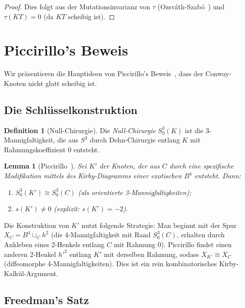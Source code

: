\documentclass[12pt,a4paper]{amsart}
\newtheorem{lemma}[theorem]{Lemma}
\theoremstyle{definition}
\newtheorem{definition_de}[theorem]{Definition}
\theoremstyle{remark}
\begin{document}
\begin{proof}
Dies folgt aus der Mutationsinvarianz von $\tau$ (Ozsváth-Szabó~\cite{OzsvathSzabo2004})
und $\tau(KT) = 0$ (da $KT$ scheibig ist).
\end{proof}

\section{Piccirillo's Beweis}

Wir präsentieren die Hauptideen von Piccirillo's Beweis~\cite{Piccirillo2020},
dass der Conway-Knoten nicht glatt scheibig ist.

\subsection{Die Schlüsselkonstruktion}

\begin{definition_de}[Null-Chirurgie]
Die \emph{Null-Chirurgie} $S^3_0(K)$ ist die 3-Mannigfaltigkeit, die aus
$S^3$ durch Dehn-Chirurgie entlang $K$ mit Rahmungskoeffizient 0 entsteht.
\end{definition_de}

\begin{lemma}[Piccirillo~\cite{Piccirillo2020}]
\label{lem:Piccirillo}
Sei $K'$ der Knoten, der aus $C$ durch eine spezifische Modifikation
mittels des Kirby-Diagramms einer exotischen $B^4$ entsteht. Dann:
\begin{enumerate}[label=\roman*)]
\item $S^3_0(K') \cong S^3_0(C)$ (als orientierte 3-Mannigfaltigkeiten);
\item $s(K') \neq 0$ (explizit: $s(K') = -2$).
\end{enumerate}
\end{lemma}

Die Konstruktion von $K'$ nutzt folgende Strategie: Man beginnt mit der
Spur $X_C = B^4 \cup_C h^2$ (die 4-Mannigfaltigkeit mit Rand $S^3_0(C)$,
erhalten durch Ankleben eines 2-Henkels entlang $C$ mit Rahmung 0).
Piccirillo findet einen anderen 2-Henkel $h'^2$ entlang $K'$ mit derselben
Rahmung, sodass $X_{K'} \cong X_C$ (diffeomorphe 4-Mannigfaltigkeiten).
Dies ist ein rein kombinatorisches Kirby-Kalkül-Argument.

\subsection{Freedman's Satz}
\end{document}

